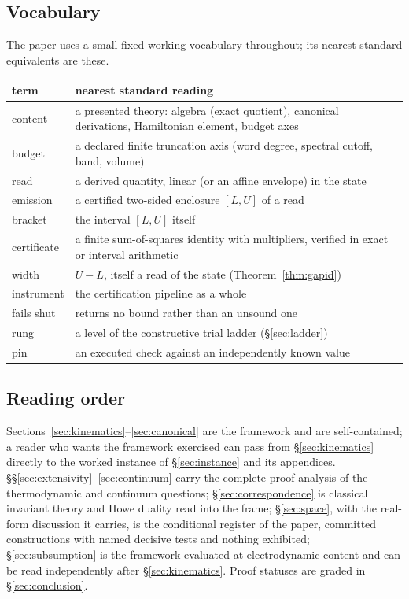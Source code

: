 \documentclass[11pt]{article}
\theoremstyle{definition}
\theoremstyle{remark}
\begin{document}
\subsection*{Vocabulary}
The paper uses a small fixed working vocabulary throughout; its nearest
standard equivalents are these.

\begin{center}
\begin{tabular}{@{}lp{}@{}}
\toprule
term & nearest standard reading \\
\midrule
content & a presented theory: algebra (exact quotient), canonical
derivations, Hamiltonian element, budget axes \\
budget & a declared finite truncation axis (word degree, spectral
cutoff, band, volume) \\
read & a derived quantity, linear (or an affine envelope) in the state \\
emission & a certified two-sided enclosure $[L,U]$ of a read \\
bracket & the interval $[L,U]$ itself \\
certificate & a finite sum-of-squares identity with multipliers,
verified in exact or interval arithmetic \\
width & $U - L$, itself a read of the state
(Theorem~\ref{thm:gapid}) \\
instrument & the certification pipeline as a whole \\
fails shut & returns no bound rather than an unsound one \\
rung & a level of the constructive trial ladder (\S\ref{sec:ladder}) \\
pin & an executed check against an independently known value \\
\bottomrule
\end{tabular}
\end{center}

\subsection*{Reading order}
Sections~\ref{sec:kinematics}--\ref{sec:canonical} are the framework
and are self-contained; a reader who wants the framework exercised can
pass from \S\ref{sec:kinematics} directly to the worked instance of
\S\ref{sec:instance} and its appendices.
\S\S\ref{sec:extensivity}--\ref{sec:continuum} carry the
complete-proof analysis of the thermodynamic and continuum questions;
\S\ref{sec:correspondence} is classical invariant theory and Howe
duality read into the frame; \S\ref{sec:space}, with the real-form
discussion it carries, is the conditional register of the paper,
committed constructions with named decisive tests and nothing
exhibited; \S\ref{sec:subsumption} is the framework evaluated at
electrodynamic content and can be read independently after
\S\ref{sec:kinematics}.  Proof statuses are graded in
\S\ref{sec:conclusion}.
\end{document}
